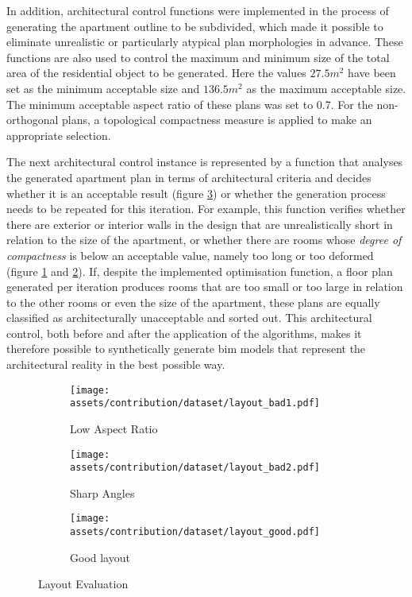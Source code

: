\documentclass[a4paper, 12pt]{report}
\begin{document}
In addition, architectural control functions were implemented in the process of generating the apartment outline to be subdivided, which made it possible to eliminate unrealistic or particularly atypical plan morphologies in advance. These functions are also used to control the maximum and minimum size of the total area of the residential object to be generated. Here the values $27.5 m^2$ have been set as the minimum acceptable size and $136.5 m^2$ as the maximum acceptable size. The minimum acceptable aspect ratio of these plans was set to 0.7. For the non-orthogonal plans, a topological compactness measure is applied to make an appropriate selection.

The next architectural control instance is represented by a function that analyses the generated apartment plan in terms of architectural criteria and decides whether it is an acceptable result (figure \ref{fig:good-layout}) or whether the generation process needs to be repeated for this iteration. For example, this function verifies whether there are exterior or interior walls in the design that are unrealistically short in relation to the size of the apartment, or whether there are rooms whose \textit{\gls{degree of compactness}} is below an acceptable value, namely too long or too deformed (figure \ref{fig:bad-layout-i} and \ref{fig:bad-layout-ii}). If, despite the implemented optimisation function, a floor plan generated per iteration produces rooms that are too small or too large in relation to the other rooms or even the size of the apartment, these plans are equally classified as architecturally unacceptable and sorted out. This architectural control, both before and after the application of the algorithms, makes it therefore possible to synthetically generate \acrshort{bim} models that represent the architectural reality in the best possible way.

\begin{figure}
\centering
\begin{subfigure}{.32\textwidth}
\centering
\texttt{[image: assets/contribution/dataset/layout\_bad1.pdf]}
\caption{Low Aspect Ratio}
\label{fig:bad-layout-i}
\end{subfigure}%
\begin{subfigure}{.34\textwidth}
\centering
\texttt{[image: assets/contribution/dataset/layout\_bad2.pdf]}
\caption{Sharp Angles}
\label{fig:bad-layout-ii}
\end{subfigure}%
\begin{subfigure}{.32\textwidth}
\centering
\texttt{[image: assets/contribution/dataset/layout\_good.pdf]}
\caption{Good layout}
\label{fig:good-layout}
\end{subfigure}
\caption{Layout Evaluation}
\label{fig:layout-evaluation}
\end{figure}
\end{document}
